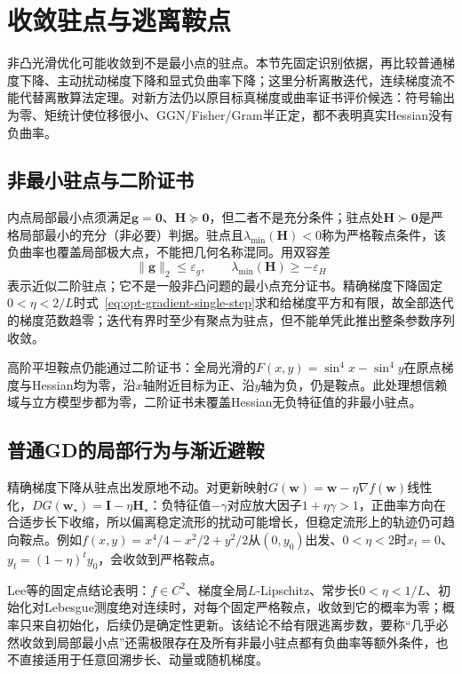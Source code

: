 \section{收敛驻点与逃离鞍点}
\label{sec:opt-stationary-saddles}

非凸光滑优化可能收敛到不是最小点的驻点。本节先固定识别依据，再比较普通梯度下降、主动扰动梯度下降和显式负曲率下降；这里分析离散迭代，连续梯度流不能代替离散算法定理。对新方法仍以原目标真梯度或曲率证书评价候选：符号输出为零、矩统计使位移很小、GGN/Fisher/Gram半正定，都不表明真实Hessian没有负曲率。

\subsection{非最小驻点与二阶证书}

内点局部最小点须满足$\bm g=\bm0$、$\bm H\succeq\bm0$，但二者不是充分条件；驻点处$\bm H\succ\bm0$是严格局部最小的充分（非必要）判据。驻点且$\lambda_{\min}(\bm H)<0$称为严格鞍点条件，该负曲率也覆盖局部极大点，不能把几何名称混同。用双容差
\[
 \|\bm g\|_2\leq\varepsilon_g,\qquad
 \lambda_{\min}(\bm H)\geq-\varepsilon_H
\]
表示近似二阶驻点；它不是一般非凸问题的最小点充分证书。精确梯度下降固定$0<\eta<2/L$时式~\eqref{eq:opt-gradient-single-step}求和给梯度平方和有限，故全部迭代的梯度范数趋零；迭代有界时至少有聚点为驻点，但不能单凭此推出整条参数序列收敛。

高阶平坦鞍点仍能通过二阶证书：全局光滑的$F(x,y)=\sin^4x-\sin^4y$在原点梯度与Hessian均为零，沿$x$轴附近目标为正、沿$y$轴为负，仍是鞍点。此处理想信赖域与立方模型步都为零，二阶证书未覆盖Hessian无负特征值的非最小驻点。

\subsection{普通GD的局部行为与渐近避鞍}

精确梯度下降从驻点出发原地不动。对更新映射$G(\bm w)=\bm w-\eta\nabla f(\bm w)$线性化，$DG(\bm w_\star)=\bm I-\eta\bm H_\star$：负特征值$-\gamma$对应放大因子$1+\eta\gamma>1$，正曲率方向在合适步长下收缩，所以偏离稳定流形的扰动可能增长，但稳定流形上的轨迹仍可趋向鞍点。例如$f(x,y)=x^4/4-x^2/2+y^2/2$从$(0,y_0)$出发、$0<\eta<2$时$x_t=0$、$y_t=(1-\eta)^ty_0$，会收敛到严格鞍点。

Lee等的固定点结论表明：$f\in C^2$、梯度全局$L$-Lipschitz、常步长$0<\eta<1/L$、初始化对Lebesgue测度绝对连续时，对每个固定严格鞍点，收敛到它的概率为零；概率只来自初始化，后续仍是确定性更新。该结论不给有限逃离步数，要称“几乎必然收敛到局部最小点”还需极限存在及所有非最小驻点都有负曲率等额外条件，也不直接适用于任意回溯步长、动量或随机梯度。

